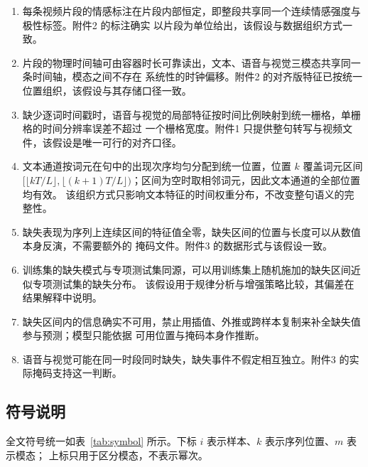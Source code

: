 \documentclass[bwprint]{gmcmthesis}
\begin{document}
\begin{enumerate}
\item 每条视频片段的情感标注在片段内部恒定，即整段共享同一个连续情感强度与极性标签。附件2 的标注确实
以片段为单位给出，该假设与数据组织方式一致。
\item 片段的物理时间轴可由容器时长可靠读出，文本、语音与视觉三模态共享同一条时间轴，模态之间不存在
系统性的时钟偏移。附件2 的对齐版特征已按统一位置组织，该假设与其存储口径一致。
\item 缺少逐词时间戳时，语音与视觉的局部特征按时间比例映射到统一栅格，单栅格的时间分辨率误差不超过
一个栅格宽度。附件1 只提供整句转写与视频文件，该假设是唯一可行的对齐口径。
\item 文本通道按词元在句中的出现次序均匀分配到统一位置，位置 $k$ 覆盖词元区间
$[\lfloor kT/L\rfloor,\lfloor (k+1)T/L\rfloor)$；区间为空时取相邻词元，因此文本通道的全部位置均有效。
该组织方式只影响文本特征的时间权重分布，不改变整句语义的完整性。
\item 缺失表现为序列上连续区间的特征值全零，缺失区间的位置与长度可以从数值本身反演，不需要额外的
掩码文件。附件3 的数据形式与该假设一致。
\item 训练集的缺失模式与专项测试集同源，可以用训练集上随机施加的缺失区间近似专项测试集的缺失分布。
该假设用于规律分析与增强策略比较，其偏差在结果解释中说明。
\item 缺失区间内的信息确实不可用，禁止用插值、外推或跨样本复制来补全缺失值参与预测；模型只能依据
可用位置与掩码本身作推断。
\item 语音与视觉可能在同一时段同时缺失，缺失事件不假定相互独立。附件3 的实际掩码支持这一判断。
\end{enumerate}

\subsection{符号说明}

全文符号统一如表~\ref{tab:symbol} 所示。下标 $i$ 表示样本、$k$ 表示序列位置、$m$ 表示模态；
上标只用于区分模态，不表示幂次。
\end{document}
